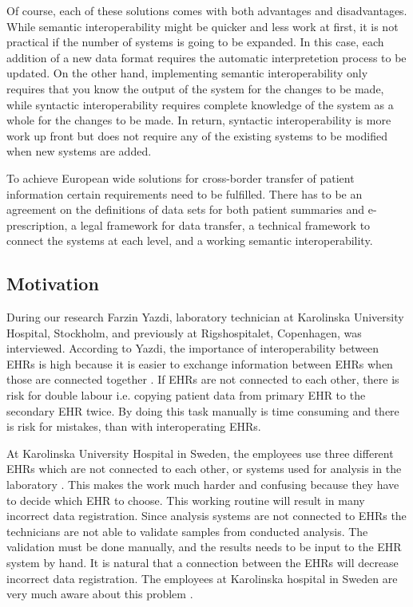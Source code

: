 \documentclass[14pt]{article}
\begin{document}
Of course, each of these solutions comes with both advantages and disadvantages.  While semantic interoperability might be quicker and less work at first, it is not practical if the number of systems is going to be expanded. In this case, each addition of a new data format requires the automatic interpretetion process to be updated.  On the other hand, implementing semantic interoperability only requires that you know the output of the system for the changes to be made, while syntactic interoperability requires complete knowledge of the system as a whole for the changes to be made.  In return, syntactic interoperability is more work up front but does not require any of the existing systems to be modified when new systems are added.

To achieve European wide solutions for cross-border transfer of patient information certain requirements need to be fulfilled. There has to be an agreement on the definitions of data sets for both patient summaries and e-prescription, a legal framework for data transfer, a technical framework to connect the systems at each level, and a working semantic \gls{interoperability}. \cite{epSOS1}

\subsection{Motivation}
\label{sec:techMotiv}
During our research Farzin Yazdi, laboratory technician at Karolinska University Hospital, Stockholm, and previously at Rigshospitalet, Copenhagen, was interviewed. According to Yazdi\cite{FarzinYazdi}, the importance of interoperability between \glspl{EHR} is high because it is easier to exchange information between \glspl{EHR} when those are connected together \cite{FarzinYazdi}. If \glspl{EHR} are not connected to each other, there is risk for double labour i.e. copying patient data from primary \gls{EHR} to the secondary \gls{EHR} twice\cite{FarzinYazdi}. By doing this task manually is time consuming and there is risk for mistakes, than with interoperating \glspl{EHR}\cite{FarzinYazdi}.

At Karolinska University Hospital in Sweden, the employees use three different \glspl{EHR} which are not connected to each other, or systems used for analysis in the laboratory \cite{FarzinYazdi}. This makes the work much harder and confusing because they have to decide which \gls{EHR} to choose. This working routine will result in many incorrect data registration. Since analysis systems are not connected to \glspl{EHR} the technicians are not able to validate samples from conducted analysis. The validation must be done manually, and the results needs to be input to the  \gls{EHR} system by hand\cite{FarzinYazdi}. It is natural that a connection between the \glspl{EHR} will decrease incorrect data registration. The employees at Karolinska hospital in Sweden are very much aware about this problem \cite{FarzinYazdi}.
\end{document}
